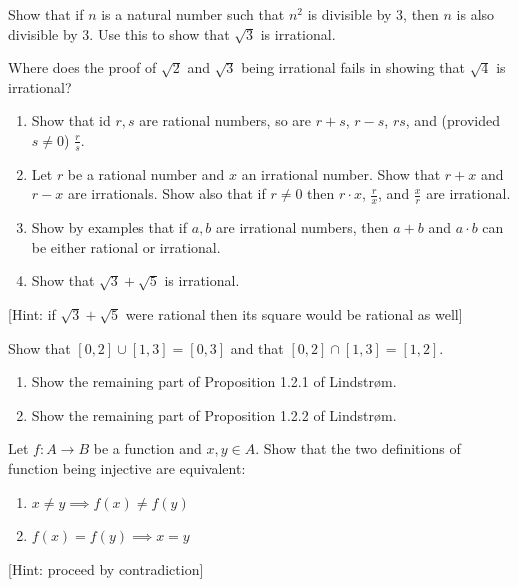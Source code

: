 \documentclass[11pt]{article}%
\begin{document}
\begin{Exercise}[title=*]
	Show that if $n$ is a natural number such that $n^2$ is divisible by 3, then $n$ is also divisible by 3. Use this to show that $\sqrt 3$ is irrational.
\end{Exercise}

\newpage
\begin{Exercise}[title=*]
	Where does the proof of $\sqrt 2$ and $\sqrt 3$ being irrational fails in showing that $\sqrt{4}$ is irrational?
\end{Exercise}


\begin{Exercise}[title=*]
	\begin{enumerate}[label={\alph*)}]
		\item Show that id $r,s$ are rational numbers, so are $r+s$, $r-s$, $rs$, and (provided $s\neq0$) $\frac{r}{s}$.
		\item Let $r$ be a rational number and $x$ an irrational number. Show that $r+x$ and $r-x$ are irrationals. Show also that if $r\neq0$ then $r\cdot x$, $\frac{r}{x}$, and $\frac{x}{r}$ are irrational. 
		\item Show by examples that if $a,b$ are irrational numbers, then $a+b$ and $a\cdot b$ can be either rational or irrational.
		\item Show that $\sqrt{3}+\sqrt{5}$ is irrational.
	\end{enumerate}
	
	[Hint: if $\sqrt{3}+\sqrt{5}$ were rational then its square would be rational as well]
	\bigskip
\end{Exercise}

\begin{Exercise}[title=*]
	Show that $[0,2]\cup [1,3] = [0,3]$ and that $[0,2]\cap [1,3] = [1,2]$.
\end{Exercise}

\begin{Exercise}[title=*$\dagger$]
	\begin{enumerate}[label={\alph*)}]
		\item Show the remaining part of Proposition 1.2.1 of Lindstrøm.
		\item Show the remaining part of Proposition 1.2.2 of Lindstrøm.
	\end{enumerate}
\end{Exercise}

\begin{Exercise}[title=*]
	Let $f:A\to B$ be a function and $x,y\in A$. Show that the two definitions of function being injective are equivalent: 
	\begin{enumerate}[label={\alph*)}]
		\item $x\neq y \implies f(x)\neq f(y)$
		\item $f(x)=f(y) \implies x=y$
	\end{enumerate}
	[Hint: proceed by contradiction]
\end{Exercise}
\newpage
\end{document}
